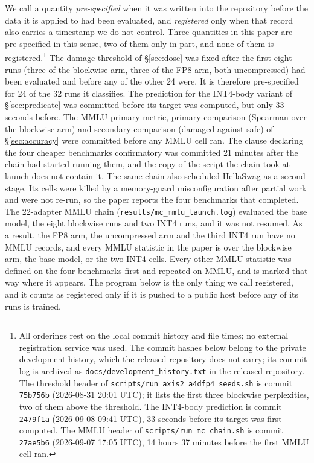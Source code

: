 \documentclass[11pt,letterpaper]{article}
\begin{document}
\medskip
We call a quantity \emph{pre-specified} when it was written into the repository before the data it is applied to had been evaluated, and \emph{registered} only when that record also carries a timestamp we do not control. Three quantities in this paper are pre-specified in this sense, two of them only in part, and none of them is registered.\footnote{All orderings rest on the local commit history and file times; no external registration service was used. The commit hashes below belong to the private development history, which the released repository does not carry; its commit log is archived as \texttt{docs/development\_history.txt} in the released repository. The threshold header of \texttt{scripts/run\_axis2\_a4dfp4\_seeds.sh} is commit \texttt{75b756b} (2026-08-31 20:01 UTC); it lists the first three blockwise perplexities, two of them above the threshold. The INT4-body prediction is commit \texttt{2479f1a} (2026-09-08 09:41 UTC), 33 seconds before its target was first computed. The MMLU header of \texttt{scripts/run\_mc\_chain.sh} is commit \texttt{27ae5b6} (2026-09-07 17:05 UTC), 14 hours 37 minutes before the first MMLU cell ran.} The damage threshold of \S\ref{sec:dose} was fixed after the first eight runs (three of the blockwise arm, three of the FP8 arm, both uncompressed) had been evaluated and before any of the other 24 were. It is therefore pre-specified for 24 of the 32 runs it classifies. The prediction for the INT4-body variant of \S\ref{sec:predicate} was committed before its target was computed, but only 33 seconds before. The MMLU primary metric, primary comparison (Spearman over the blockwise arm) and secondary comparison (damaged against safe) of \S\ref{sec:accuracy} were committed before any MMLU cell ran. The clause declaring the four cheaper benchmarks confirmatory was committed 21 minutes after the chain had started running them, and the copy of the script the chain took at launch does not contain it. The same chain also scheduled HellaSwag as a second stage. Its cells were killed by a memory-guard misconfiguration after partial work and were not re-run, so the paper reports the four benchmarks that completed. The 22-adapter MMLU chain (\texttt{results/mc\_mmlu\_launch.log}) evaluated the base model, the eight blockwise runs and two INT4 runs, and it was not resumed. As a result, the FP8 arm, the uncompressed arm and the third INT4 run have no MMLU records, and every MMLU statistic in the paper is over the blockwise arm, the base model, or the two INT4 cells. Every other MMLU statistic was defined on the four benchmarks first and repeated on MMLU, and is marked that way where it appears. The program below is the only thing we call registered, and it counts as registered only if it is pushed to a public host before any of its runs is trained.
\end{document}
